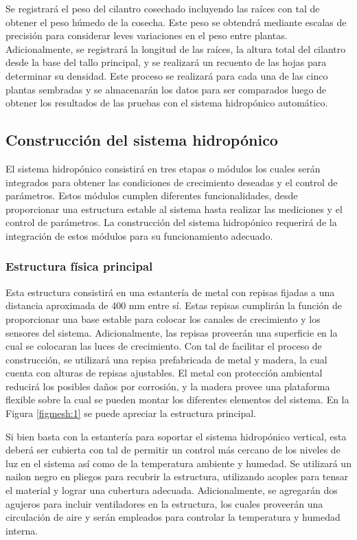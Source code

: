 Se registrará el peso del cilantro cosechado incluyendo las raíces con tal de obtener el peso húmedo de la cosecha. Este peso se obtendrá mediante escalas de precisión para considerar leves variaciones en el peso entre plantas. Adicionalmente, se registrará la longitud de las raíces, la altura total del cilantro desde la base del tallo principal, y se realizará un recuento de las hojas para determinar su densidad. Este proceso se realizará para cada una de las cinco plantas sembradas y se almacenarán los datos para ser comparados luego de obtener los resultados de las pruebas con el sistema hidropónico automático.

\subsection*{Construcción del sistema hidropónico}
El sistema hidropónico consistirá en tres etapas o módulos los cuales serán integrados para obtener las condiciones de crecimiento deseadas y el control de parámetros. Estos módulos cumplen diferentes funcionalidades, desde proporcionar una estructura estable al sistema hasta realizar las mediciones y el control de parámetros. La construcción del sistema hidropónico requerirá de la integración de estos módulos para su funcionamiento adecuado.

\subsubsection{Estructura física principal}
Esta estructura consistirá en una estantería de metal con repisas fijadas a una distancia aproximada de 400 mm entre sí. Estas repisas cumplirán la función de proporcionar una base estable para colocar los canales de crecimiento y los sensores del sistema. Adicionalmente, las repisas proveerán una superficie en la cual se colocaran las luces de crecimiento. Con tal de facilitar el proceso de construcción, se utilizará una repisa prefabricada de metal y madera, la cual cuenta con alturas de repisas ajustables. El metal con protección ambiental reducirá los posibles daños por corrosión, y la madera provee una plataforma flexible sobre la cual se pueden montar los diferentes elementos del sistema. En la Figura \ref{figmesh:1} se puede apreciar la estructura principal.

Si bien basta con la estantería para soportar el sistema hidropónico vertical, esta deberá ser cubierta con tal de permitir un control más cercano de los niveles de luz en el sistema así como de la temperatura ambiente y humedad. Se utilizará un nailon negro en pliegos para recubrir la estructura, utilizando acoples para tensar el material y lograr una cubertura adecuada. Adicionalmente, se agregarán dos agujeros para incluir ventiladores en la estructura, los cuales proveerán una circulación de aire y serán empleados para controlar la temperatura y humedad interna.

